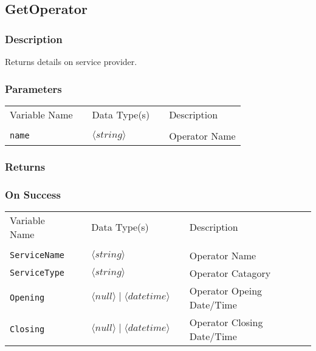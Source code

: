 \subsection{GetOperator}

\subsubsection{Description}

Returns details on service provider.

\subsubsection{Parameters}

\begin{tabular}{lllll}
Variable Name	&		&	Data Type(s)		&	&	Description	\\
				&	&	&	&	\\
\verb!name! & \hspace{15mm} & $\langle string\rangle $ & \hspace{15mm} & Operator Name \\
\end{tabular}

\subsubsection{Returns}

\subsubsection{On Success}

\begin{tabular}{lllll}
Variable Name	&		&	Data Type(s)		&	&	Description	\\
				&	&	&	&	\\
\verb!ServiceName! & \hspace{15mm} & $\langle string\rangle $ & \hspace{15mm} & Operator Name \\
\verb!ServiceType! & \hspace{15mm} & $\langle string\rangle $ & \hspace{15mm} & Operator Catagory \\
\verb!Opening! & \hspace{15mm} & $\langle null\rangle  \mid \langle datetime\rangle $ & \hspace{15mm} & Operator Opeing Date/Time \\
\verb!Closing! & \hspace{15mm} & $\langle null\rangle  \mid \langle datetime\rangle $ & \hspace{15mm} & Operator Closing Date/Time \\
\end{tabular}

